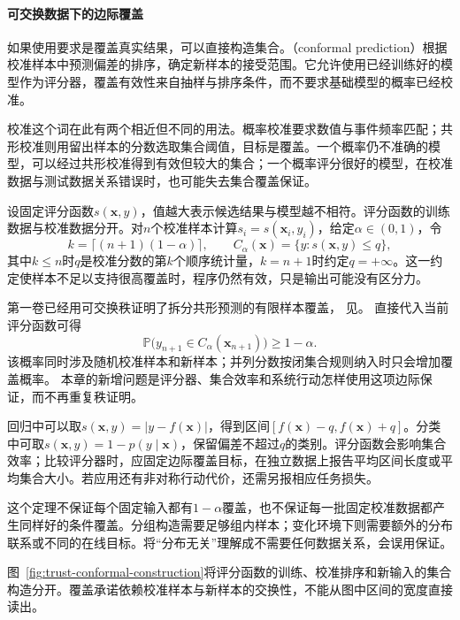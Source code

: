 \paragraph{可交换数据下的边际覆盖}

如果使用要求是覆盖真实结果，可以直接构造集合。（conformal prediction）根据校准样本中预测偏差的排序，确定新样本的接受范围。它允许使用已经训练好的模型作为评分器，覆盖有效性来自抽样与排序条件，而不要求基础模型的概率已经校准。

校准这个词在此有两个相近但不同的用法。概率校准要求数值与事件频率匹配；共形校准则用留出样本的分数选取集合阈值，目标是覆盖。一个概率仍不准确的模型，可以经过共形校准得到有效但较大的集合；一个概率评分很好的模型，在校准数据与测试数据关系错误时，也可能失去集合覆盖保证。

设固定评分函数$s(\bm{x},y)$，值越大表示候选结果与模型越不相符。评分函数的训练数据与校准数据分开。对$n$个校准样本计算$s_i=s(\bm{x}_i,y_i)$，给定$\alpha\in(0,1)$，令
\begin{equation}
 k=\lceil(n+1)(1-\alpha)\rceil,\qquad
 C_\alpha(\bm{x})=\{y:s(\bm{x},y)\leq q\},
 \label{eq:reliability-conformal-set}
\end{equation}
其中$k\leq n$时$q$是校准分数的第$k$个顺序统计量，$k=n+1$时约定$q=+\infty$。这一约定使样本不足以支持很高覆盖时，程序仍然有效，只是输出可能没有区分力。

第一卷已经用可交换秩证明了拆分共形预测的有限样本覆盖，
见。
直接代入当前评分函数可得
\[
 \mathbb P\bigl(y_{n+1}\in C_\alpha(\bm{x}_{n+1})\bigr)
 \geq1-\alpha.
\]
该概率同时涉及随机校准样本和新样本；并列分数按闭集合规则纳入时只会增加覆盖概率。
本章的新增问题是评分器、集合效率和系统行动怎样使用这项边际保证，而不再重复秩证明。

回归中可以取$s(\bm{x},y)=|y-f(\bm{x})|$，得到区间$[f(\bm{x})-q,f(\bm{x})+q]$。分类中可取$s(\bm{x},y)=1-p(y\mid\bm{x})$，保留偏差不超过$q$的类别。评分函数会影响集合效率；比较评分器时，应固定边际覆盖目标，在独立数据上报告平均区间长度或平均集合大小。若应用还有非对称行动代价，还需另报相应任务损失。

这个定理不保证每个固定输入都有$1-\alpha$覆盖，也不保证每一批固定校准数据都产生同样好的条件覆盖。分组构造需要足够组内样本；变化环境下则需要额外的分布联系或不同的在线目标。将“分布无关”理解成不需要任何数据关系，会误用保证。

图~\ref{fig:trust-conformal-construction}将评分函数的训练、校准排序和新输入的集合构造分开。覆盖承诺依赖校准样本与新样本的交换性，不能从图中区间的宽度直接读出。

